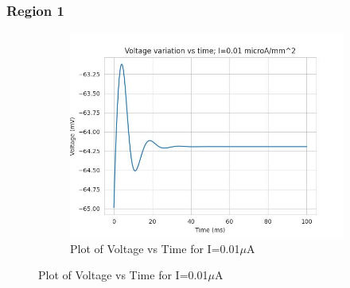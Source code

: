 \documentclass{article}
\begin{document}
\subsubsection{Region 1}
\begin{figure}[h]
    \centering
    \begin{subfigure}[b]{0.45\textwidth}
        \includegraphics[width=1.5\textwidth]{1.jpg}
        \caption{Plot of Voltage vs Time for I=0.01$\mu$A}
        \label{fig:IOU1}
    \end{subfigure}
    

\end{figure}
\end{document}
